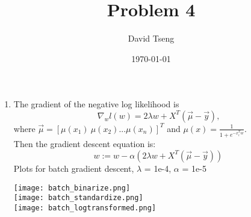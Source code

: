\documentclass[11pt]{article}
\begin{document}
\title{Problem 4}
\author{David Tseng}
\date{\today}
\maketitle

\begin{enumerate}
\item The gradient of the negative log likelihood is
$$\nabla_w l(w)= 2 \lambda w + X^T (\vec \mu - \vec y) \text{,}$$
where $\vec \mu = [\mu(x_1)\  \mu(x_2) ... \mu(x_n)]^T$ and $\mu(x) = \frac{1}{1 + e^{-x_i^T w}}$. \\
Then the gradient descent equation is: 
$$w := w - \alpha(2 \lambda w + X^T (\vec \mu - \vec y))$$
Plots for batch gradient descent, $\lambda$ = 1e-4, $\alpha$ = 1e-5\\
\begin{center}
\texttt{[image: batch\_binarize.png]}\\
\texttt{[image: batch\_standardize.png]}\\
\texttt{[image: batch\_logtransformed.png]}
\end{center}


\end{enumerate}
\end{document}
